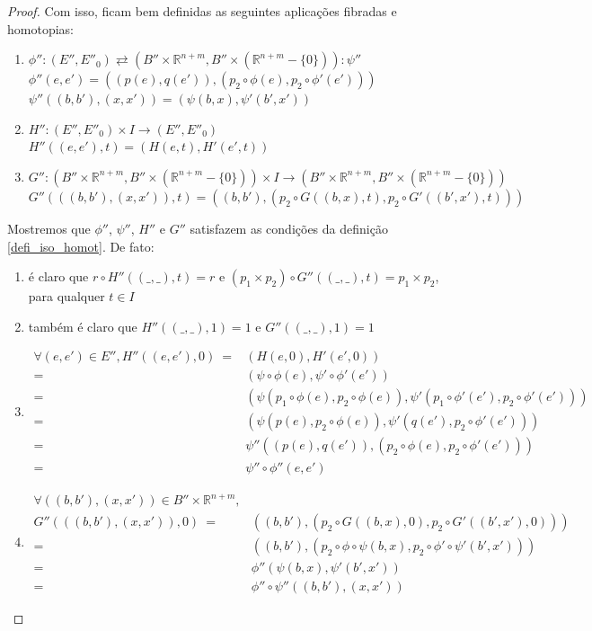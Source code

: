 \documentclass[12pt,oneside]{book} %
\newcommand{\R}{\mathbb{R}}
\begin{document}
\begin{proof}
	\par Com isso, ficam bem definidas as seguintes aplicações fibradas e homotopias:
	
	\begin{enumerate}
		\item $\phi'':(E'',E''_{0})\rightleftarrows (B''\times \R^{n+m},B''\times (\R^{n+m}-\{ 0 \})):\psi''$ \\
		$ \phi''(e,e')=((p(e),q(e')),(p_{2}\circ\phi(e),p_{2}\circ\phi'(e'))) $ \\
		$ \psi''((b,b'),(x,x'))=(\psi(b,x),\psi'(b',x')) $
		\item $H'':(E'',E''_{0})\times I\to (E'',E''_{0})$ \\
		$ H''((e,e'),t)=(H(e,t),H'(e',t)) $
		\item $G'':(B''\times \R^{n+m},B''\times (\R^{n+m}-\{ 0 \}))\times I\to (B''\times \R^{n+m},B''\times (\R^{n+m}-\{ 0 \}))$ \\
		$ G''(((b,b'),(x,x')),t)=((b,b'),(p_{2}\circ G((b,x),t),p_{2}\circ G'((b',x'),t))) $
	\end{enumerate}
	
	\par Mostremos que $\phi''$, $\psi''$, $H''$ e $G''$ satisfazem as condições da definição \ref{defi_iso_homot}. De fato:
	
	\begin{enumerate}
		\item é claro que $r\circ H''((\_,\_),t)=r$ e $(p_{1}\times p_{2})\circ G''((\_,\_),t)=p_{1}\times p_{2}$, para qualquer $t\in I$
		\item também é claro que $H''((\_,\_),1)=1$ e $G''((\_,\_),1)=1$
		\item $\begin{array}{rl}
			\forall (e,e')\in E'', H''((e,e'),0) \ = & (H(e,0),H'(e',0)) \\
			= & (\psi\circ\phi(e),\psi'\circ\phi'(e')) \\
			= & (\psi(p_{1}\circ\phi(e),p_{2}\circ\phi(e)),\psi'(p_{1}\circ\phi'(e'),p_{2}\circ\phi'(e'))) \\
			= & (\psi(p(e),p_{2}\circ\phi(e)),\psi'(q(e'),p_{2}\circ\phi'(e'))) \\
			= & \psi''((p(e),q(e')),(p_{2}\circ\phi(e),p_{2}\circ\phi'(e'))) \\
			= & \psi''\circ\phi''(e,e')
		\end{array}$
		\item $\begin{array}{rl}
			\forall ((b,b'),(x,x'))\in B''\times\R^{n+m}, & \\
			G''(((b,b'),(x,x')),0) \ = & ((b,b'),(p_{2}\circ G((b,x),0),p_{2}\circ G'((b',x'),0))) \\
			= & ((b,b'),(p_{2}\circ\phi\circ\psi(b,x),p_{2}\circ\phi'\circ\psi'(b',x'))) \\
			= & \phi''(\psi(b,x),\psi'(b',x')) \\
			= & \phi''\circ\psi''((b,b'),(x,x'))
		\end{array}$
	\end{enumerate}
	

\end{proof}
\end{document}

